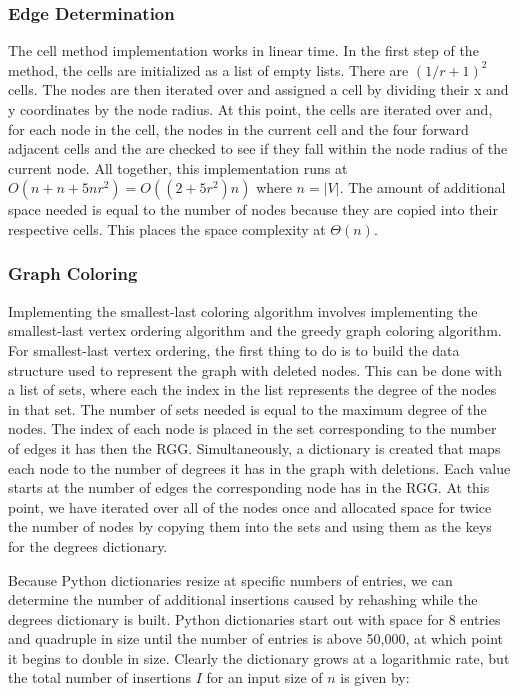 \documentclass{article}
\begin{document}
        \subsubsection{Edge Determination}
        The cell method implementation works in linear time. In the first step of the method, the cells are initialized as a list of empty lists. There are $(1/r + 1)^2$ cells. The nodes are then iterated over and assigned a cell by dividing their x and y coordinates by the node radius. At this point, the cells are iterated over and, for each node in the cell, the nodes in the current cell and the four forward adjacent cells and the are checked to see if they fall within the node radius of the current node. All together, this implementation runs at $O\left(n + n + 5nr^2\right) = O\left((2 + 5r^2)n\right)$ where $n = |V|$. The amount of additional space needed is equal to the number of nodes because they are copied into their respective cells. This places the space complexity at $\Theta(n)$.

        \subsubsection{Graph Coloring}
        Implementing the smallest-last coloring algorithm involves implementing the smallest-last vertex ordering algorithm and the greedy graph coloring algorithm. For smallest-last vertex ordering, the first thing to do is to build the data structure used to represent the graph with deleted nodes. This can be done with a list of sets, where each the index in the list represents the degree of the nodes in that set. The number of sets needed is equal to the maximum degree of the nodes. The index of each node is placed in the set corresponding to the number of edges it has then the RGG. Simultaneously, a dictionary is created that maps each node to the number of degrees it has in the graph with deletions. Each value starts at the number of edges the corresponding node has in the RGG. At this point, we have iterated over all of the nodes once and allocated space for twice the number of nodes by copying them into the sets and using them as the keys for the degrees dictionary.
        \par
        Because Python dictionaries resize at specific numbers of entries, we can determine the number of additional insertions caused by rehashing while the degrees dictionary is built. Python dictionaries start out with space for 8 entries and quadruple in size until the number of entries is above 50,000, at which point it begins to double in size. Clearly the dictionary grows at a logarithmic rate, but the total number of insertions $I$ for an input size of $n$ is given by:
\end{document}
